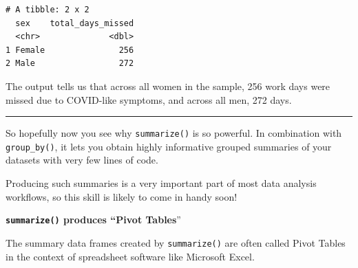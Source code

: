 \documentclass[
  letterpaper,
  DIV=11,
  numbers=noendperiod]{scrreprt}
\begin{document}
\begin{verbatim}
# A tibble: 2 x 2
  sex    total_days_missed
  <chr>              <dbl>
1 Female               256
2 Male                 272
\end{verbatim}

The output tells us that across all women in the sample, 256 work days
were missed due to COVID-like symptoms, and across all men, 272 days.

\begin{center}\rule{0.5\linewidth}{0.5pt}\end{center}

So hopefully now you see why \texttt{summarize()} is so powerful. In
combination with \texttt{group\_by()}, it lets you obtain highly
informative grouped summaries of your datasets with very few lines of
code.

Producing such summaries is a very important part of most data analysis
workflows, so this skill is likely to come in handy soon!

\begin{tcolorbox}[enhanced jigsaw, titlerule=0mm, colback=white, left=2mm, breakable, opacitybacktitle=0.6, colbacktitle=quarto-callout-note-color!10!white, colframe=quarto-callout-note-color-frame, bottomtitle=1mm, opacityback=0, coltitle=black, arc=.35mm, toptitle=1mm, title=\textcolor{quarto-callout-note-color}{\faInfo}\hspace{0.5em}{Vocab}, leftrule=.75mm, toprule=.15mm, bottomrule=.15mm, rightrule=.15mm]

\textbf{\texttt{summarize()} produces ``Pivot Tables}''

The summary data frames created by \texttt{summarize()} are often called
Pivot Tables in the context of spreadsheet software like Microsoft
Excel.

\end{tcolorbox}
\end{document}
